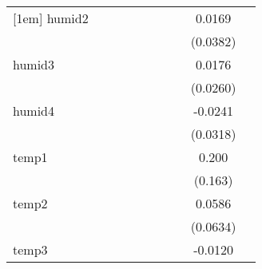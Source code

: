 {\begin{tabular}{l*{9}{c}}
[1em]
humid2      &                     &                     &                     &                     &                     &                     &                     &      0.0169         &                     \\
            &                     &                     &                     &                     &                     &                     &                     &    (0.0382)         &                     \\
[1em]
humid3      &                     &                     &                     &                     &                     &                     &                     &      0.0176         &                     \\
            &                     &                     &                     &                     &                     &                     &                     &    (0.0260)         &                     \\
[1em]
humid4      &                     &                     &                     &                     &                     &                     &                     &     -0.0241         &                     \\
            &                     &                     &                     &                     &                     &                     &                     &    (0.0318)         &                     \\
[1em]
temp1       &                     &                     &                     &                     &                     &                     &                     &       0.200         &                     \\
            &                     &                     &                     &                     &                     &                     &                     &     (0.163)         &                     \\
[1em]
temp2       &                     &                     &                     &                     &                     &                     &                     &      0.0586         &                     \\
            &                     &                     &                     &                     &                     &                     &                     &    (0.0634)         &                     \\
[1em]
temp3       &                     &                     &                     &                     &                     &                     &                     &     -0.0120         &                     \\

\end{tabular}}
